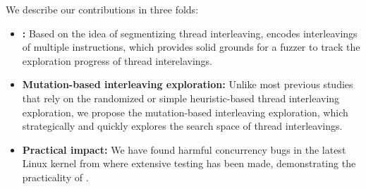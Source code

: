 We describe our contributions in three folds:

\begin{itemize}
\item \textbf{\Intcov:}
  Based on the idea of segmentizing thread interleaving, \intcov
  encodes interleavings of multiple instructions, which provides solid
  grounds for a fuzzer to track the exploration progress of thread
  interelavings.
\item \textbf{Mutation-based interleaving exploration:}
  Unlike most previous studies that rely on the randomized or simple
  heuristic-based thread interleaving exploration, we propose the
  mutation-based interleaving exploration, which strategically and
  quickly explores the search space of thread interleavings.
\item \textbf{Practical impact:}
  We have found \totalbugs harmful concurrency bugs in the latest
  Linux kernel from where extensive testing has been made,
  demonstrating the practicality of \sys.
\end{itemize}

